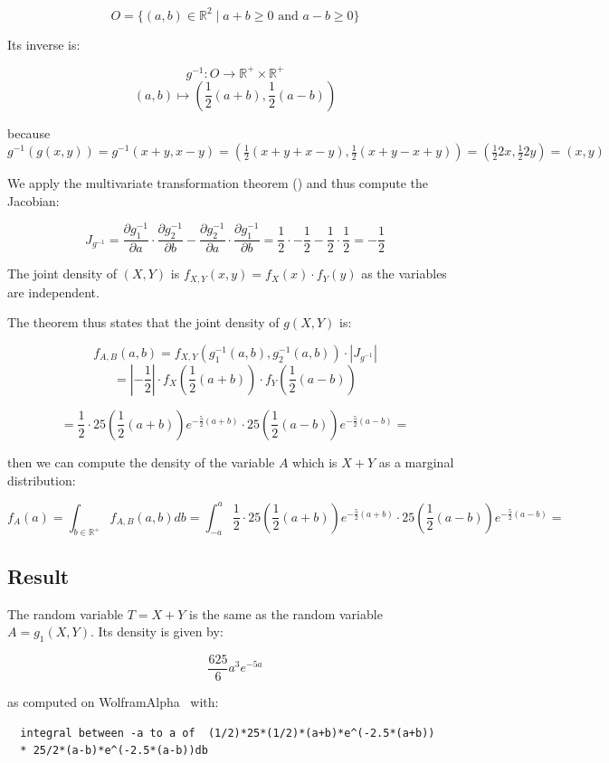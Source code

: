 \documentclass{article}
\newcommand\R{{\mathbb R}}
\begin{document}
$$O = \{ (a,b)\in\R^2 \mid a+b \geq 0 \mbox{ and } a-b\geq 0\}$$

Its inverse is:

$$ g^{-1}: O \longrightarrow \R^+ \times \R^+$$
$$ (a,b) \mapsto \left( \frac{1}{2} (a+b), \frac{1}{2}(a-b) \right)$$

because $g^{-1} (g(x,y)) = g^{-1}(x+y, x-y) = \left ( \frac{1}{2} (x+y+x-y), \frac{1}{2} ( x+y-x+y) \right ) = \left ( \frac{1}{2} 2x, \frac{1}{2} 2y\right ) = (x,y)$


We apply the multivariate transformation theorem (\cite[2.7]{Hogg-McKean}) and thus compute the Jacobian:

\newcommand{\half}{\frac{1}{2}}

$$J_{g^{-1}} =  
   \frac{\partial g^{-1}_1}{\partial a}\cdot\frac{\partial g^{-1}_2}{\partial b}- \frac{\partial g^{-1}_2}{\partial a}\cdot\frac{\partial g^{-1}_1}{\partial b}
    = \half\cdot-\half-\half\cdot\half=-\frac{1}{2}$$

The joint density of $(X,Y)$ is $f_{X,Y}(x,y) = f_X(x)\cdot f_Y(y)$ as the variables are independent.

The theorem thus states that the joint density of $g(X,Y)$ is:

$$ f_{A,B}(a,b) = f_{X,Y}\left( g_1^{-1}(a,b), g_2^{-1}(a,b)\right) \cdot | J_{g^{-1}} | $$
$$ = |-\frac{1}{2}|\cdot f_X(\frac{1}{2}(a+b))\cdot f_Y(\frac{1}{2}(a-b))$$

$$ = \frac{1}{2} \cdot 25(\frac{1}{2}(a+b))e^{-\frac{5}{2}(a+b)} 
           \cdot 25(\frac{1}{2}(a-b))e^{-\frac{5}{2}(a-b)} = $$

then we can compute the density of the variable $A$ which is $X+Y$ as a marginal distribution: 

$$f_A(a) = \int_{b\in\R^+} f_{A,B}(a,b) db = \int _{-a}^{a} \frac{1}{2} \cdot 25(\frac{1}{2}(a+b))e^{-\frac{5}{2}(a+b)} 
           \cdot 25(\frac{1}{2}(a-b))e^{-\frac{5}{2}(a-b)} = $$
      
\subsection{Result}

The random variable $T=X+Y$ is the same as the random variable $A = g_1(X,Y)$. Its density is given by:
           
           $$ \frac{625}{6} a^3 e^{-5 a} $$

as computed on WolframAlpha~\cite{wolfram-alpha} with:

\begin{verbatim}
  integral between -a to a of  (1/2)*25*(1/2)*(a+b)*e^(-2.5*(a+b)) 
  * 25/2*(a-b)*e^(-2.5*(a-b))db
\end{verbatim}




\end{document}
